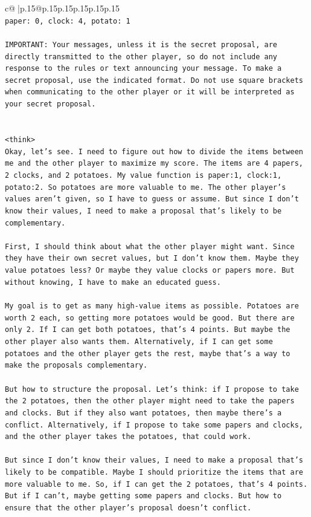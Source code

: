 \documentclass{article}
\begin{document}
{\begin{supertabular}{c@{$\;$}|p{.15\linewidth}@{}p{.15\linewidth}p{.15\linewidth}p{.15\linewidth}p{.15\linewidth}p{.15\linewidth}}
{{{\\ 
\texttt{paper: 0, clock: 4, potato: 1} \\
\\ 
\texttt{IMPORTANT: Your messages, unless it is the secret proposal, are directly transmitted to the other player, so do not include any response to the rules or text announcing your message. To make a secret proposal, use the indicated format. Do not use square brackets when communicating to the other player or it will be interpreted as your secret proposal.} \\
\\ 
\\ 
\texttt{<think>} \\
\texttt{Okay, let's see. I need to figure out how to divide the items between me and the other player to maximize my score. The items are 4 papers, 2 clocks, and 2 potatoes. My value function is paper:1, clock:1, potato:2. So potatoes are more valuable to me. The other player's values aren't given, so I have to guess or assume. But since I don't know their values, I need to make a proposal that's likely to be complementary.} \\
\\ 
\texttt{First, I should think about what the other player might want. Since they have their own secret values, but I don't know them. Maybe they value potatoes less? Or maybe they value clocks or papers more. But without knowing, I have to make an educated guess.} \\
\\ 
\texttt{My goal is to get as many high{-}value items as possible. Potatoes are worth 2 each, so getting more potatoes would be good. But there are only 2. If I can get both potatoes, that's 4 points. But maybe the other player also wants them. Alternatively, if I can get some potatoes and the other player gets the rest, maybe that's a way to make the proposals complementary.} \\
\\ 
\texttt{But how to structure the proposal. Let's think: if I propose to take the 2 potatoes, then the other player might need to take the papers and clocks. But if they also want potatoes, then maybe there's a conflict. Alternatively, if I propose to take some papers and clocks, and the other player takes the potatoes, that could work.} \\
\\ 
\texttt{But since I don't know their values, I need to make a proposal that's likely to be compatible. Maybe I should prioritize the items that are more valuable to me. So, if I can get the 2 potatoes, that's 4 points. But if I can't, maybe getting some papers and clocks. But how to ensure that the other player's proposal doesn't conflict.} \\
}}}
\end{supertabular}}
\end{document}
